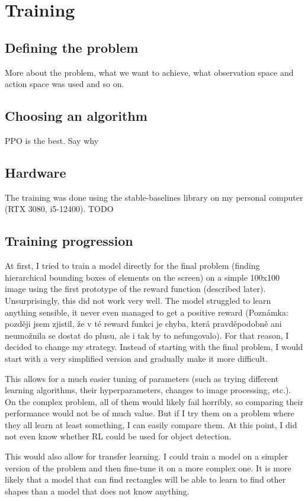 \documentclass[
  digital,     %
  oneside,     %
  nosansbold,  %
  nocolorbold, %
  lof,         %
  lot,         %
]{fithesis4}
\begin{document}
\chapter{Training}

\section{Defining the problem}
More about the problem, what we want to achieve, what observation space and action space was used and so on.

\section{Choosing an algorithm}
PPO is the best. Say why

\section{Hardware}
The training was done using the stable-baselines library on my personal computer (RTX 3080, i5-12400). TODO

\section{Training progression}
At first, I tried to train a model directly for the final problem (finding hierarchical bounding boxes of elements on the screen) on a simple 100x100 image using the first prototype of the reward function (described later). Unsurprisingly, this did not work very well. The model struggled to learn anything sensible, it never even managed to get a positive reward (Poznámka: později jsem zjistil, že v té reward funkci je chyba, která pravděpodobně ani neumožnila se dostat do plusu, ale i tak by to nefungovalo). For that reason, I decided to change my strategy. Instead of starting with the final problem, I would start with a very simplified version and gradually make it more difficult.

This allows for a much easier tuning of parameters (such as trying different learning algorithms, their hyperparameters, changes to image processing, etc.). On the complex problem, all of them would likely fail horribly, so comparing their performance would not be of much value. But if I try them on a problem where they all learn at least something, I can easily compare them. At this point, I did not even know whether RL could be used for object detection.

This would also allow for transfer learning. I could train a model on a simpler version of the problem and then fine-tune it on a more complex one. It is more likely that a model that can find rectangles will be able to learn to find other shapes than a model that does not know anything.
\end{document}
